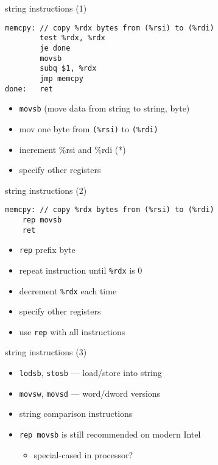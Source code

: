\begin{frame}[fragile,label=string1]{string instructions (1)}
\begin{lstlisting}[style=small]
memcpy: // copy %rdx bytes from (%rsi) to (%rdi)
        test %rdx, %rdx
        je done
        movsb
        subq $1, %rdx
        jmp memcpy
done:   ret
\end{lstlisting}
\begin{itemize}
\item {\tt movsb} (move data from string to string, byte)
\item mov one byte from {\tt (\%rsi)} to {\tt (\%rdi)}
\item increment \%rsi and \%rdi (*)
\item {} specify other registers
\end{itemize}
\end{frame}

\begin{frame}[fragile,label=string2]{string instructions (2)}
\begin{lstlisting}[style=small]
memcpy: // copy %rdx bytes from (%rsi) to (%rdi)
    rep movsb
    ret
\end{lstlisting}
\begin{itemize}
\item {\tt rep} prefix byte
\vspace{.5cm}
\item repeat instruction until {\tt \%rdx} is 0
\item decrement {\tt \%rdx} each time
\item {} specify other registers
\item {} use {\tt rep} with all instructions
\end{itemize}
\end{frame}

\begin{frame}{string instructions (3)}
\begin{itemize}
\item {\tt lodsb}, {\tt stosb} --- load/store into string
\item {\tt movsw}, {\tt movsd} --- word/dword versions
\item string comparison instructions
\vspace{.5cm}
\item {\tt rep movsb} is still recommended on modern Intel
    \begin{itemize}
    \item special-cased in processor?
    \end{itemize}
\end{itemize}
\end{frame}

